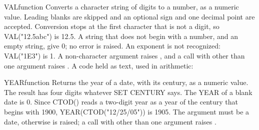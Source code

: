 \begin{XbaseEntry}{VAL}{function}
Converts a character string of digits to a number, as a numeric value.
\Syntax
{}
\Usage
Leading blanks are skipped and an optional sign and one decimal point are accepted. Conversion stops at the first character that is not a digit, so VAL("12.5abc") is 12.5. A string that does not begin with a number, and an empty string, give 0; no error is raised. An exponent is not recognized: VAL("1E3") is 1. A non-character argument raises , and a call with other than one argument raises .
\Examples
{}
A code held as text, used in arithmetic:
\end{XbaseEntry}

\begin{XbaseEntry}{YEAR}{function}
Returns the year of a date, with its century, as a numeric value.
\Syntax
{}
\Usage
The result has four digits whatever SET CENTURY says. The YEAR of a blank date is 0. Since CTOD() reads a two-digit year as a year of the century that begins with 1900, YEAR(CTOD("12/25/05")) is 1905. The argument must be a date, otherwise  is raised; a call with other than one argument raises .
\Examples
{}
\end{XbaseEntry}
